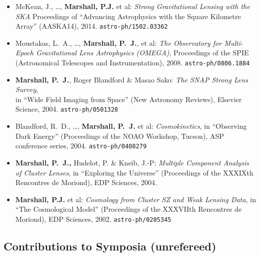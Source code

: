 \begin{itemize}

\item{McKean, J., \ldots, \textbf{Marshall, P.J.} et al:
\textit{Strong Gravitational Lensing with the SKA}
Proceedings of ``Advancing Astrophysics with the Square Kilometre Array'' (AASKA14), 2014.
\texttt{astro-ph/1502.03362}
}

\item{{Moustakas}, L.~A., \dots, \textbf{Marshall, P.~J.}, et al:
\textit{The Observatory for Multi-Epoch Gravitational Lens Astrophysics (OMEGA)},
Proceedings of the SPIE (Astronomical Telescopes and Instrumentation), 2008.
\texttt{astro-ph/0806.1884}
}

\item{\textbf{Marshall, P.~J.}, Roger Blandford \& Masao Sako:
\textit{The SNAP Strong Lens Survey},\\
in ``Wide Field Imaging from Space'' (New Astronomy Reviews), Elsevier Science, 2004.
\texttt{astro-ph/0501328}
}

\item{{Blandford}, R.~D., \ldots, \textbf{{Marshall}, P.~J.} et al:
\textit{Cosmokinetics},
in ``Observing Dark Energy'' (Proceedings of the NOAO Workshop, Tucson), ASP conference series, 2004.
\texttt{astro-ph/0408279}
}

\item{\textbf{{Marshall}, P.~J.,} {Hudelot}, P. \& {Kneib}, J.-P:
\textit{Multiple Component Analysis of Cluster Lenses},
in ``Exploring the Universe'' (Proceedings of the XXXIXth Rencontres de Moriond), EDP Sciences, 2004.
}

\item{\textbf{Marshall, P.J.} et al:
\textit{Cosmology from Cluster SZ and Weak Lensing Data},
in ``The Cosmological Model'' (Proceedings of the XXXVIIth Rencontres de Moriond), EDP Sciences, 2002.
\texttt{astro-ph/0205345}
}

\end{itemize}

\vspace{2\baselineskip}


\subsection*{Contributions to Symposia (unrefereed)}


